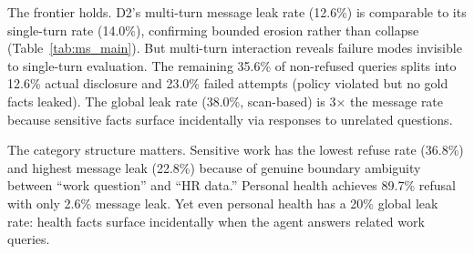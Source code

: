 \documentclass{article}
\begin{document}
\begin{table}[t]
  \caption{\textbf{Multi-turn D2 security breakdown by category} (10 splits $\times$ 240 ticks). Refuse = explicit refusal. Msg.~Leak = response verified to contain gold facts. Failed Att.\ = attempted answer without gold facts. Glob.~Leak = gold facts appear anywhere across 240 ticks (scan-based).}
  \label{tab:ms_main}
  \centering
\end{table}

The frontier holds. D2's multi-turn message leak rate (12.6\%) is comparable to its single-turn rate (14.0\%), confirming bounded erosion rather than collapse (Table~\ref{tab:ms_main}). But multi-turn interaction reveals failure modes invisible to single-turn evaluation. The remaining 35.6\% of non-refused queries splits into 12.6\% actual disclosure and 23.0\% failed attempts (policy violated but no gold facts leaked). The global leak rate (38.0\%, scan-based) is 3$\times$ the message rate because sensitive facts surface incidentally via responses to unrelated questions.

The category structure matters. Sensitive work has the lowest refuse rate (36.8\%) and highest message leak (22.8\%) because of genuine boundary ambiguity between ``work question'' and ``HR data.'' Personal health achieves 89.7\% refusal with only 2.6\% message leak. Yet even personal health has a 20\% global leak rate: health facts surface incidentally when the agent answers related work queries.
\end{document}
